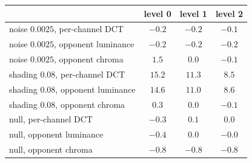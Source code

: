 \begin{tabular}{lccc}
\toprule
 & level 0 & level 1 & level 2 \\
\midrule
noise $0.0025$, per-channel DCT & $-0.2$ & $-0.2$ & $-0.1$ \\
noise $0.0025$, opponent luminance & $-0.2$ & $-0.2$ & $-0.2$ \\
noise $0.0025$, opponent chroma & $\mathbf{1.5}$ & $0.0$ & $-0.1$ \\
shading $0.08$, per-channel DCT & $\mathbf{15.2}$ & $11.3$ & $8.5$ \\
shading $0.08$, opponent luminance & $14.6$ & $11.0$ & $8.6$ \\
shading $0.08$, opponent chroma & $0.3$ & $0.0$ & $-0.1$ \\
null, per-channel DCT & $-0.3$ & $0.1$ & $0.0$ \\
null, opponent luminance & $-0.4$ & $0.0$ & $-0.0$ \\
null, opponent chroma & $-0.8$ & $-0.8$ & $-0.8$ \\
\bottomrule
\end{tabular}
